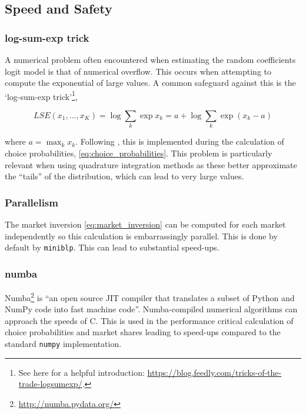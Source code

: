 \documentclass[parskip=half]{scrartcl}
\newcommand{\code}[1]{\texttt{#1}}
\begin{document}
\subsection{Speed and Safety}

\subsubsection{log-sum-exp trick}

A numerical problem often encountered when estimating the random coefficients logit model is that of numerical overflow. This occurs when attempting to compute the exponential of large values. A common safeguard against this is the `log-sum-exp trick'\footnote{See here for a helpful introduction: \url{https://blog.feedly.com/tricks-of-the-trade-logsumexp/}.},

\begin{equation}
LSE(x_1, \dots, x_K) = \log \sum_k \exp x_k = a + \log \sum_k \exp (x_k - a)
\end{equation}

where \(a = \max_k x_k\). Following \cite{conlon2019best}, this is implemented during the calculation of choice probabilities, \eqref{eq:choice_probabilities}. This problem is particularly relevant when using quadrature integration methods as these better approximate the ``tails'' of the distribution, which can lead to very large values.

\subsubsection{Parallelism}

The market inversion \eqref{eq:market_inversion} can be computed for each market independently so this calculation is embarrassingly parallel. This is done by default by \code{miniblp}. This can lead to substantial speed-ups.

\subsubsection{numba}

Numba\footnote{\url{http://numba.pydata.org/}} is ``an open source JIT compiler that translates a subset of Python and NumPy code into fast machine code''. Numba-compiled numerical algorithms can approach the speeds of C. This is used in the performance critical calculation of choice probabilities and market shares leading to speed-ups compared to the standard \code{numpy} implementation.
\end{document}
